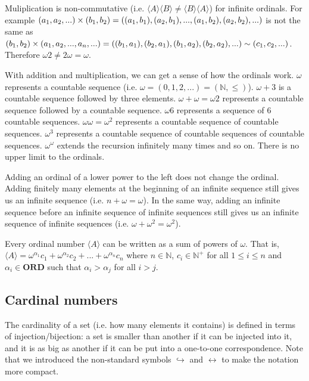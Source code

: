 \documentclass{bareminimum}
\def\ordinals{\textbf{ORD}}
\def\ordeq{\sim}
\def\crdleq{\hookrightarrow}
\def\crdeq{\leftrightarrow}
\begin{document}
\begin{remark}
	Muliplication is non-commutative (i.e. $\langle A \rangle \langle B \rangle \neq \langle B \rangle \langle A \rangle$) for infinite ordinals. For example $(a_1, a_2, ...) \times (b_1, b_2) = ((a_1, b_1), (a_2, b_1), ..., (a_1, b_2), (a_2, b_2), \\...)$ is not the same as $(b_1, b_2) \times (a_1, a_2, ..., a_n, ...) = ((b_1, a_1), (b_2, a_1), (b_1, a_2), \\ (b_2, a_2), ...) \ordeq (c_1, c_2, ...)$. Therefore $\omega 2 \neq 2 \omega = \omega$.
	
	With addition and multiplication, we can get a sense of how the ordinals work. $\omega$ represents a countable sequence (i.e. $\omega = (0, 1, 2, ...) = (\mathbb{N}, \leq)$). $\omega +3$ is a countable sequence followed by three elements. $\omega + \omega  = \omega2$ represents a countable sequence followed by a countable sequence. $\omega6$ represents a sequence of 6 countable sequences. $\omega\omega = \omega^2$ represents a countable sequence of countable sequences. $\omega^3$ represents a countable sequence of countable sequences of countable sequences. $\omega^\omega$ extends the recursion infinitely many times and so on. There is no upper limit to the ordinals.
	
	Adding an ordinal of a lower power to the left does not change the ordinal. Adding finitely many elements at the beginning of an infinite sequence still gives us an infinite sequence (i.e. $n + \omega = \omega$). In the same way, adding an infinite sequence before an infinite sequence of infinite sequences still gives us an infinite sequence of infinite sequences (i.e. $\omega +\omega^2 = \omega^2$).
\end{remark}

\begin{prop}
	Every ordinal number $\langle A \rangle$ can be written as a sum of powers of $\omega$. That is, $\langle A \rangle = \omega^{\alpha_1} c_1 + \omega^{\alpha_2} c_2 + ... + \omega^{\alpha_n} c_n$ where $n \in \mathbb{N}$, $c_i \in \mathbb{N}^+$ for all $1 \leq i \leq n$ and $\alpha_i \in \ordinals$ such that $\alpha_i > \alpha_j$ for all $i > j$.
\end{prop}

\subsection{Cardinal numbers}

\begin{remark}
	The cardinality of a set (i.e. how many elements it contains) is defined in terms of injection/bijection: a set is smaller than another if it can be injected into it, and it is as big as another if it can be put into a one-to-one correspondence.  Note that we introduced the non-standard symbols $\crdleq$ and $\crdeq$ to make the notation more compact.
\end{remark}
\end{document}
